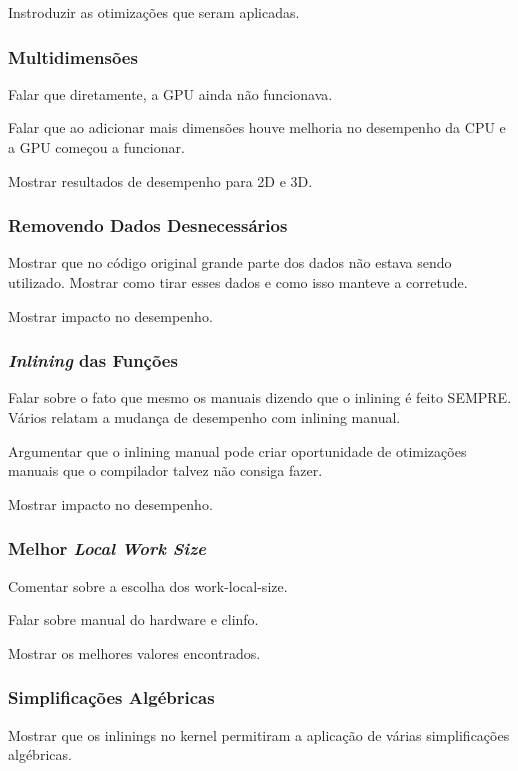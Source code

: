 \documentclass[12pt]{article}
\begin{document}
Instroduzir as otimizações que seram aplicadas.

\subsubsection{Multidimensões} \label{multi}

Falar que diretamente, a GPU ainda não funcionava. 

Falar que ao adicionar mais dimensões houve melhoria no desempenho da CPU e a GPU começou a funcionar. 

Mostrar resultados de desempenho para 2D e 3D.

\subsubsection{Removendo Dados Desnecessários}

Mostrar que no código original grande parte dos dados não estava sendo utilizado. Mostrar como tirar esses dados e como isso manteve a corretude.

Mostrar impacto no desempenho.

\subsubsection{\textit{Inlining} das Funções}

Falar sobre o fato que mesmo os manuais dizendo que o inlining é feito SEMPRE. Vários relatam a mudança de desempenho com inlining manual.

Argumentar que o inlining manual pode criar oportunidade de otimizações manuais que o compilador talvez não consiga fazer.

Mostrar impacto no desempenho.

\subsubsection{Melhor\textit{ Local Work Size}}

Comentar sobre a escolha dos work-local-size.

Falar sobre manual do hardware e clinfo.

Mostrar os melhores valores encontrados.

\subsubsection{Simplificações Algébricas}

Mostrar que os inlinings no kernel permitiram a aplicação de várias simplificações algébricas.
\end{document}
